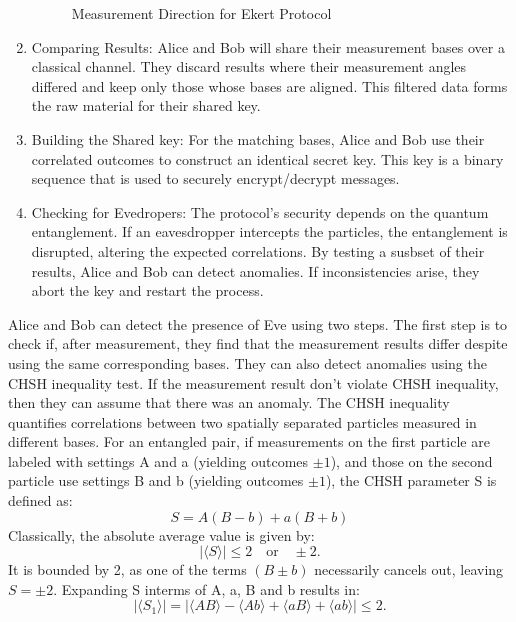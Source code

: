 \documentclass{article}
\begin{document}
\begin{enumerate}
          \begin{figure}[!h]
              \centering
              
              \caption{Measurement Direction for Ekert Protocol}
              \label{fig:mesurement_direction}
          \end{figure}

    \item Comparing Results:  Alice and Bob will share their measurement bases over a classical channel. They discard results where their measurement angles differed and keep only those whose bases are aligned. This filtered data forms the raw material for their shared key.
    \item Building the Shared key: For the matching bases, Alice and Bob use their correlated outcomes to construct an identical secret key. This key is a binary sequence that is used to securely encrypt/decrypt messages.
    \item Checking for Evedropers: The protocol's security depends on the quantum entanglement. If an eavesdropper intercepts the particles, the entanglement is disrupted, altering the expected correlations. By testing a susbset of their results, Alice and Bob can detect anomalies. If inconsistencies arise, they abort the key and restart the process.
\end{enumerate}

Alice and Bob can detect the presence of Eve using two steps. The first step is to check if, after measurement, they find that the measurement results differ despite using the same corresponding bases. They can also detect anomalies using the CHSH inequality test. If the measurement result don't violate CHSH inequality, then they can assume that there was an anomaly.
The CHSH inequality quantifies correlations between two spatially separated particles measured in different bases. For an entangled pair, if measurements on the first particle are labeled with settings A and a (yielding outcomes $ \pm 1 $), and those on the second particle use settings B and b (yielding outcomes $ \pm 1 $), the CHSH parameter S is defined as:
\begin{equation}
    S = A(B - b) + a(B + b)
\end{equation}
Classically, the absolute average value is given by:
\[
    |\langle S \rangle| \leq 2 \quad \text{or} \quad \pm 2.
\]
It is bounded by 2, as one of the terms \( (B \pm b) \) necessarily cancels out, leaving \( S = \pm 2 \).
Expanding S interms of A, a, B and b results in: \[
    \left| \langle S_1 \rangle \right| = \left| \langle AB \rangle - \langle Ab \rangle + \langle aB \rangle + \langle ab \rangle \right| \leq 2.
\]
\end{document}

